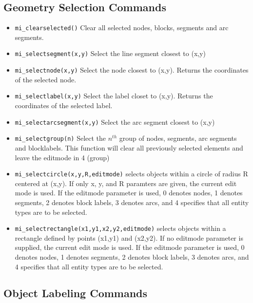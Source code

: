 \subsection{Geometry Selection Commands}

\begin{itemize}
\item{\tt mi\_clearselected()} Clear all selected nodes, blocks, segments
and arc segments.

\item{\tt mi\_selectsegment(x,y)} Select the line segment closest to
(x,y)

\item{\tt mi\_selectnode(x,y)} Select the node closest to (x,y).
Returns the coordinates of the selected node.

\item{\tt mi\_selectlabel(x,y)} Select the label closet to (x,y).
Returns the coordinates of the selected label.

\item{\tt mi\_selectarcsegment(x,y)} Select the arc segment closest to
(x,y)

\item{\tt mi\_selectgroup(n)} Select the $n^{th}$ group of nodes, segments, arc
segments and blocklabels. This function will clear all previously selected
elements and leave the editmode in 4 (group)

\item{\tt mi\_selectcircle(x,y,R,editmode)} selects objects within a circle of radius
R centered at (x,y).  If only x, y, and R paramters are given, the current
edit mode is used.  If the editmode parameter is used, 0 denotes nodes, 1 denotes segments,
2 denotes block labels, 3 denotes arcs, and 4 specifies that all entity types are to be selected.

\item{\tt mi\_selectrectangle(x1,y1,x2,y2,editmode)} selects objects within a rectangle
defined by points (x1,y1) and (x2,y2). If no editmode parameter is supplied,
the current edit mode is used.  If the editmode parameter is used, 0 denotes nodes, 1 denotes segments,
2 denotes block labels, 3 denotes arcs, and 4 specifies that all entity types are to be selected.

\end{itemize}

\subsection{Object Labeling Commands}

